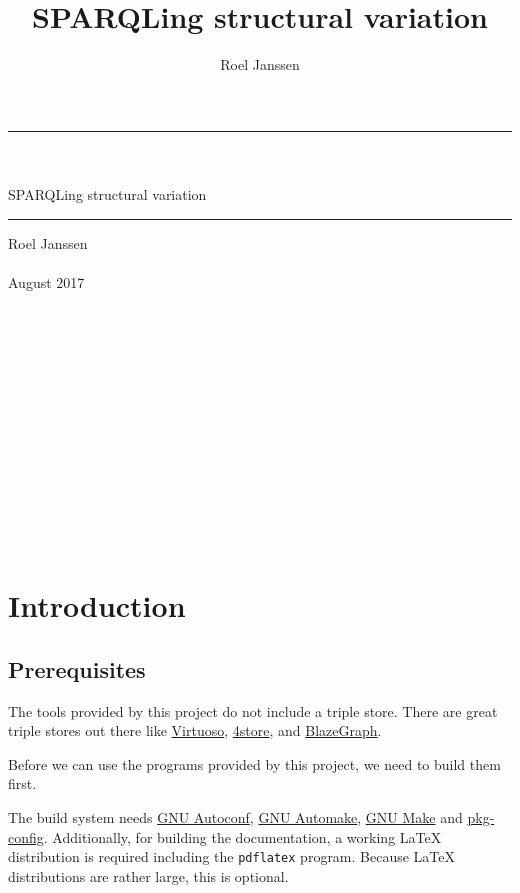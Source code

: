 \documentclass[11pt,a4paper,oneside]{book}
\title{SPARQLing structural variation}
\author{Roel Janssen}
\begin{document}
\begin{titlepage}
  \vspace*{\fill}
  \begin{center}
    \rule{\textwidth}{1.0pt}~\\~\\
    \Huge SPARQLing structural variation
    \rule{\textwidth}{1.0pt}
    \Large Roel Janssen~\\~\\
    \large August 2017
    ~\\~\\~\\~\\~\\~\\~\\~\\~\\~\\~\\~\\~\\~\\
  \end{center}
  \vspace*{\fill}

  \thispagestyle{empty}
\end{titlepage}


\setcounter{page}{1}
\hypersetup{linkcolor=black}
\tableofcontents
\newpage{}
\hypersetup{linkcolor=LinkGray}
\setcounter{page}{1}

\chapter{Introduction}

\section{Prerequisites}
\label{sec:prerequisites}

  The tools provided by this project do not include a triple store.  There are
  great triple stores out there like \href{https://virtuoso.openlinksw.com/}
  {Virtuoso}, \href{https://github.com/4store/4store}{4store}, and
  \href{https://www.blazegraph.com/}{BlazeGraph}.

  Before we can use the programs provided by this project, we need to build
  them first.

  The build system needs \href{https://www.gnu.org/software/autoconf}{GNU Autoconf},
  \href{https://www.gnu.org/software/automake}{GNU Automake},
  \href{https://www.gnu.org/software/make}{GNU Make} and
  \href{https://www.freedesktop.org/wiki/Software/pkg-config/}{pkg-config}.
  Additionally, for building the documentation, a working \LaTeX{} distribution is
  required including the \texttt{pdflatex} program.  Because \LaTeX{} distributions
  are rather large, this is optional.
\end{document}
